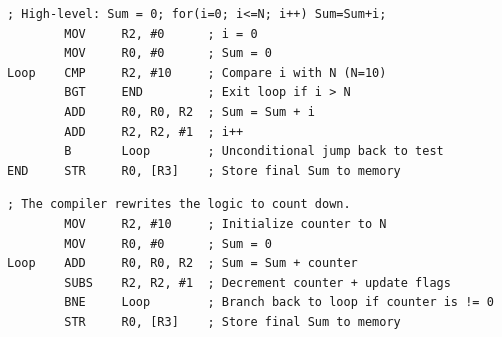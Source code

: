 \documentclass[../comorg-part1.tex]{subfiles}
\begin{document}
\begin{lstlisting}[language=ARM, title={Summation 1 to N: Standard Pre-test}, keepspaces=true]
; High-level: Sum = 0; for(i=0; i<=N; i++) Sum=Sum+i;
        MOV     R2, #0      ; i = 0
        MOV     R0, #0      ; Sum = 0
Loop    CMP     R2, #10     ; Compare i with N (N=10)
        BGT     END         ; Exit loop if i > N
        ADD     R0, R0, R2  ; Sum = Sum + i
        ADD     R2, R2, #1  ; i++
        B       Loop        ; Unconditional jump back to test
END     STR     R0, [R3]    ; Store final Sum to memory
\end{lstlisting}

\begin{lstlisting}[language=ARM, title={Summation 1 to N: Compiler Optimized Post-test}, keepspaces=true]
; The compiler rewrites the logic to count down.
        MOV     R2, #10     ; Initialize counter to N
        MOV     R0, #0      ; Sum = 0
Loop    ADD     R0, R0, R2  ; Sum = Sum + counter
        SUBS    R2, R2, #1  ; Decrement counter + update flags
        BNE     Loop        ; Branch back to loop if counter is != 0
        STR     R0, [R3]    ; Store final Sum to memory
\end{lstlisting}
\end{document}
